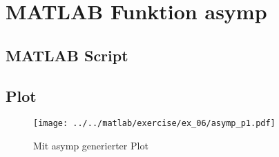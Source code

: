 \section{MATLAB Funktion asymp}

\subsection{MATLAB Script}



\subsection{Plot}
\begin{figure}[h!]
	\centering
	\texttt{[image: ../../matlab/exercise/ex\_06/asymp\_p1.pdf]}
	\caption{Mit asymp generierter Plot}
\end{figure}
